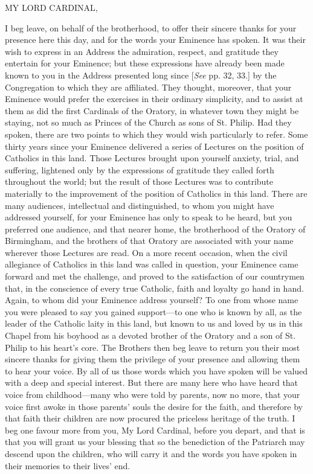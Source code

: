 MY LORD CARDINAL,

I beg leave, on behalf of the brotherhood, to offer their sincere
thanks for your presence here this day, and for the words your
Eminence has spoken. It was their wish to express in an Address the
admiration, respect, and gratitude they entertain for your Eminence;
but these expressions have already been made known to you in the
Address presented long since [\emph{See} pp. 32, 33.] by the
Congregation to which they are affiliated. They thought, moreover,
that your Eminence would prefer the exercises in their ordinary
simplicity, and to assist at them as did the first Cardinals of the
Oratory, in whatever town they might be staying, not so much as
Princes of the Church as sons of St. Philip. Had they spoken, there
are two points to which they would wish particularly to refer.
Some thirty years since your Eminence delivered a series of Lectures
on the position of Catholics in this land. Those Lectures brought upon
yourself anxiety, trial, and suffering, lightened only by the
expressions of gratitude they called forth throughout the world; but
the result of those Lectures was to contribute materially to the
improvement of the position of Catholics in this land. There are many
audiences, intellectual and distinguished, to whom you might have
addressed yourself, for your Eminence has only to speak to be heard,
but you preferred one audience, and that nearer home, the brotherhood
of the Oratory of Birmingham, and the brothers of that Oratory are
associated with your name wherever those Lectures are read. On a more
recent occasion, when the civil allegiance of Catholics in this land
was called in question, your Eminence came forward and met the
challenge, and proved to the satisfaction of our countrymen that, in
the conscience of every true Catholic, faith and loyalty go hand in
hand. Again, to whom did your Eminence address yourself? To one from
whose name you were pleased to say you gained support—to one who is
known by all, as the leader of the Catholic laity in this land, but
known to us and loved by us in this Chapel from his boyhood as a
devoted brother of the Oratory and a son of St. Philip to his heart’s core. The Brothers then beg leave to return you their most
sincere thanks for giving them the privilege of your presence and
allowing them to hear your voice. By all of us those words which you
have spoken will be valued with a deep and special interest. But there
are many here who have heard that voice from childhood—many who were
told by parents, now no more, that your voice first awoke in those
parents’ souls the desire for the faith, and therefore by that faith
their children are now procured the priceless heritage of the truth. I
beg one favour more from you, My Lord Cardinal, before you depart, and
that is that you will grant us your blessing that so the benediction
of the Patriarch may descend upon the children, who will carry it and
the words you have spoken in their memories to their lives’ end.

